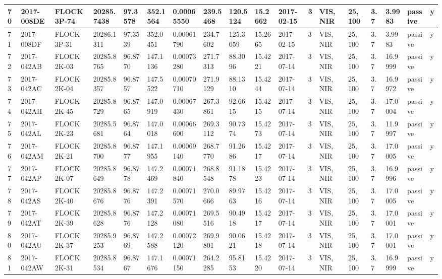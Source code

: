 \documentclass[12pt,a4paper,notitlepage,twoside,openright]{report}
\begin{document}
\begin{longtable}{|l|l|l|l|l|l|l|l|l|l|l|l|l|l|l|l|l|l|}
        70 & 2017-008DE & FLOCK 3P-74 & 20285.7438 & 97.3578 & 352.1564 & 0.00065550 & 239.5468 & 120.5124 & 15.2662 & 2017-02-15 & 3 & VIS, NIR & 25, 100 & 3.7 & 3.9983 & passive & y \\ \hline
        71 & 2017-008DF & FLOCK 3P-31 & 20286.1311 & 97.3539 & 352.0451 & 0.00061790 & 234.7602 & 125.3059 & 15.2665 & 2017-02-15 & 3 & VIS, NIR & 25, 100 & 3.7 & 3.9983 & passive & y \\ \hline
        72 & 2017-042AB & FLOCK 2K-03 & 20285.8765 & 96.8770 & 147.1136 & 0.00073280 & 271.7313 & 88.3096 & 15.4221 & 2017-07-14 & 3 & VIS, NIR & 25, 100 & 3.7 & 16.9999 & passive & y \\ \hline
        73 & 2017-042AC & FLOCK 2K-04 & 20285.8357 & 96.8757 & 147.5522 & 0.00070710 & 271.9129 & 88.1310 & 15.4244 & 2017-07-14 & 3 & VIS, NIR & 25, 100 & 3.7 & 16.9972 & passive & y \\ \hline
        74 & 2017-042AH & FLOCK 2K-45 & 20285.8729 & 96.8765 & 147.0919 & 0.00067430 & 267.3861 & 92.6615 & 15.4215 & 2017-07-14 & 3 & VIS, NIR & 25, 100 & 3.7 & 17.0004 & passive & y \\ \hline
        75 & 2017-042AL & FLOCK 2K-23 & 20285.5681 & 96.8764 & 147.0018 & 0.00066600 & 269.3112 & 90.7374 & 15.4273 & 2017-07-14 & 3 & VIS, NIR & 25, 100 & 3.7 & 11.9997 & passive & y \\ \hline
        76 & 2017-042AM & FLOCK 2K-21 & 20285.8700 & 96.8777 & 147.1955 & 0.00069140 & 268.7770 & 91.2686 & 15.4217 & 2017-07-14 & 3 & VIS, NIR & 25, 100 & 3.7 & 17.0005 & passive & y \\ \hline
        77 & 2017-042AP & FLOCK 2K-07 & 20285.8649 & 96.8778 & 147.2469 & 0.00071840 & 268.8548 & 91.1878 & 15.4223 & 2017-07-14 & 3 & VIS, NIR & 25, 100 & 3.7 & 16.9996 & passive & y \\ \hline
        78 & 2017-042AS & FLOCK 2K-40 & 20285.8676 & 96.8776 & 147.2391 & 0.00071570 & 270.0666 & 89.9763 & 15.4216 & 2017-07-14 & 3 & VIS, NIR & 25, 100 & 3.7 & 17.0005 & passive & y \\ \hline
        79 & 2017-042AT & FLOCK 2K-39 & 20285.8628 & 96.8776 & 147.2128 & 0.00071080 & 269.5516 & 90.4918 & 15.4217 & 2017-07-14 & 3 & VIS, NIR & 25, 100 & 3.7 & 17.0001 & passive & y \\ \hline
        80 & 2017-042AU & FLOCK 2K-37 & 20285.9253 & 96.8769 & 147.2588 & 0.00072120 & 269.9801 & 90.0621 & 15.4218 & 2017-07-14 & 3 & VIS, NIR & 25, 100 & 3.7 & 17.0001 & passive & y \\ \hline
        81 & 2017-042AW & FLOCK 2K-31 & 20285.8534 & 96.8767 & 147.1676 & 0.00071150 & 264.2285 & 95.8153 & 15.4220 & 2017-07-14 & 3 & VIS, NIR & 25, 100 & 3.7 & 16.9999 & passive & y \\ \hline

\end{longtable}
\end{document}

